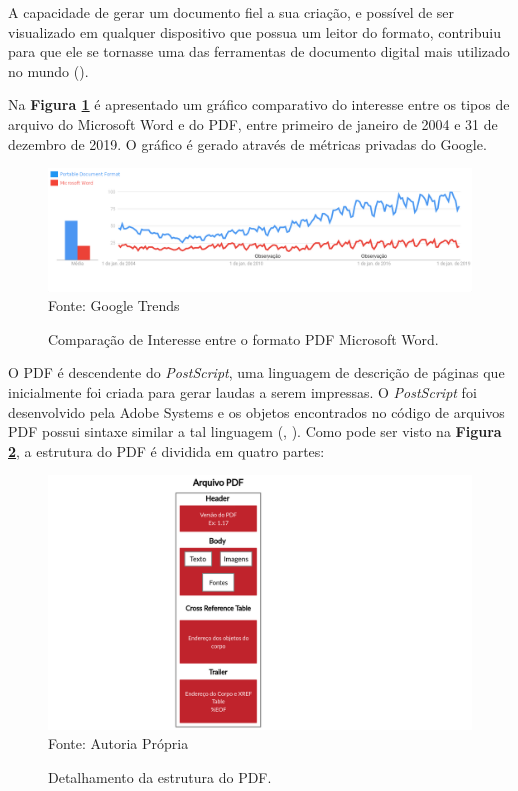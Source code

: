 A capacidade de gerar um documento fiel a sua criação, e possível de ser visualizado em qualquer dispositivo que possua um leitor do formato, contribuiu para que ele se tornasse uma das ferramentas de documento digital mais utilizado no mundo (\hspace{1sp}\cite{adobePDF}).

Na \textbf{Figura \ref{trends}} é apresentado um gráfico comparativo do interesse entre os tipos de arquivo do Microsoft Word e do PDF, entre primeiro de janeiro de 2004 e 31 de dezembro de 2019. O gráfico é gerado através de métricas privadas do Google.

\begin{figure}[H]
\centering
\captionsetup{justification   = raggedright,
              singlelinecheck = false}
\caption{Comparação de Interesse entre o formato PDF  Microsoft Word.}\label{trends}
\includegraphics[scale=0.4]{figs/pdfTrends.png}
\footnotesize Fonte: Google Trends
\end{figure}

O PDF é descendente do \textit{PostScript}, uma linguagem de descrição de páginas que inicialmente foi criada para gerar laudas a serem impressas. O \textit{PostScript} foi desenvolvido pela Adobe Systems e os objetos encontrados no código de arquivos PDF possui sintaxe similar a tal linguagem (\citeauthor{preface2001pdf}, \citeyear{preface2001pdf}).  Como pode ser visto na \textbf{Figura \ref{PDF_Structure}}, a estrutura do PDF é dividida em quatro partes: 

\begin{figure}[H]
\centering
\captionsetup{justification   = raggedright,
              singlelinecheck = false}
\caption{Detalhamento da estrutura do PDF.}\label{PDF_Structure}
\includegraphics[scale=0.3]{figs/PDF.png}
\footnotesize Fonte: Autoria Própria
\end{figure}

